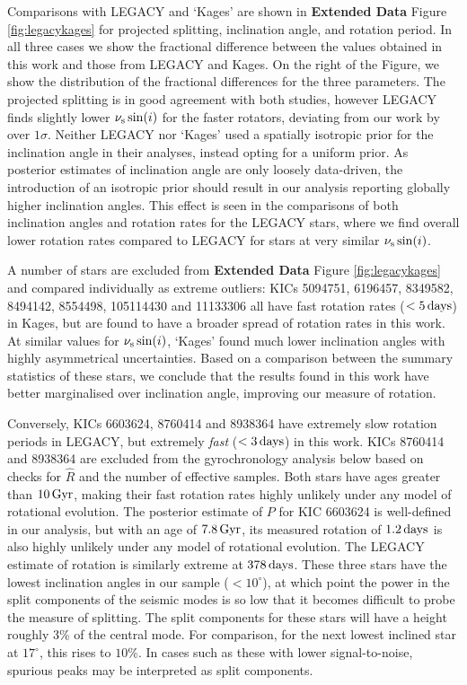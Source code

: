 Comparisons with LEGACY and `Kages' are shown in \textbf{Extended Data} Figure \ref{fig:legacykages} for projected splitting, inclination angle, and rotation period. In all three cases we show the fractional difference between the values obtained in this work and those from LEGACY and Kages. On the right of the Figure, we show the distribution of the fractional differences for the three parameters.
The projected splitting is in good agreement with both studies, however LEGACY finds slightly lower $\nu_{\rm s}\sin(i)$ for the faster rotators, deviating from our work by over $1\sigma$. Neither LEGACY nor `Kages' used a spatially isotropic prior for the inclination angle in their analyses, instead opting for a uniform prior. As posterior estimates of inclination angle are only loosely data-driven, the introduction of an isotropic prior should result in our analysis reporting globally higher inclination angles. This effect is seen in the comparisons of both inclination angles and rotation rates for the LEGACY stars, where we find overall lower rotation rates compared to LEGACY for stars at very similar $\nu_{\rm s}\sin(i)$.

A number of stars are excluded from \textbf{Extended Data} Figure \ref{fig:legacykages} and compared individually as extreme outliers: KICs 5094751, 6196457, 8349582, 8494142, 8554498, 105114430 and 11133306 all have fast rotation rates ($<5\, \rm days$) in Kages, but are found to have a broader spread of rotation rates in this work. At similar values for $\nu_{\rm s}\sin(i)$, `Kages' found much lower inclination angles with highly asymmetrical uncertainties. Based on a comparison between the summary statistics of these stars, we conclude that the results found in this work have better marginalised over inclination angle, improving our measure of rotation.

Conversely, KICs 6603624, 8760414 and 8938364 have extremely slow rotation periods in LEGACY, but extremely \textit{fast} ($<3\, \rm {days}$) in this work. KICs 8760414 and 8938364 are excluded from the gyrochronology analysis below based on checks for $\hat{R}$ and the number of effective samples. Both stars have ages greater than $10\, \rm Gyr$, making their fast rotation rates highly unlikely under any model of rotational evolution. The posterior estimate of $P$ for KIC 6603624 is well-defined in our analysis, but with an age of $7.8\, \rm Gyr$, its measured rotation of $1.2\, \rm days$ is also highly unlikely under any model of rotational evolution. The LEGACY estimate of rotation is similarly extreme at $378\, \rm days$. These three stars have the lowest inclination angles in our sample ($< 10^\circ$), at which point the power in the split components of the seismic modes is so low that it becomes difficult to probe the measure of splitting. The split components for these stars will have a height roughly 3\% of the central mode. For comparison, for the next lowest inclined star at $17^\circ$, this rises to $10\%$. In cases such as these with lower signal-to-noise, spurious peaks may be interpreted as split components.\\

